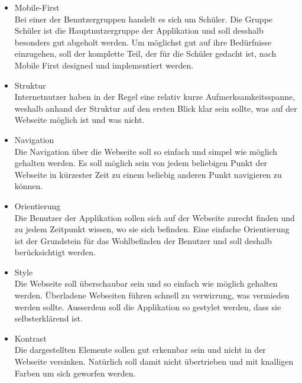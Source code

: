 \begin{itemize}
	\item Mobile-First \\
		Bei einer der Benutzergruppen handelt es sich um Schüler. Die Gruppe Schüler ist die Hauptnutzergruppe der Applikation und soll desshalb besonders gut abgeholt werden. Um möglichst gut auf ihre Bedürfnisse einzugehen, soll der komplette Teil, der für die Schüler gedacht ist, nach Mobile First designed und implementiert werden.
		
	\item Struktur \\
		Internetnutzer haben in der Regel eine relativ kurze Aufmerksamkeitsspanne, weshalb anhand der Struktur auf den ersten Blick klar sein sollte, was auf der Webseite möglich ist und was nicht. 
		
	\item Navigation \\
		Die Navigation über die Webseite soll so einfach und simpel wie möglich gehalten werden. Es soll möglich sein von jedem beliebigen Punkt der Webseite in kürzester Zeit zu einem beliebig anderen Punkt navigieren zu können.
		
	
	\item Orientierung \\
		Die Benutzer der Applikation sollen sich auf der Webseite zurecht finden und zu jedem Zeitpunkt wissen, wo sie sich befinden. Eine einfache Orientierung ist der Grundstein für das Wohlbefinden der Benutzer und soll deshalb berücksichtigt werden.
		
	\item Style \\
		Die Webseite soll überschaubar sein und so einfach wie möglich gehalten werden. Überladene Webseiten führen schnell zu verwirrung, was vermieden werden sollte. Ausserdem soll die Applikation so gestylet werden, dass sie selbsterklärend ist.
		
	\item Kontrast \\
		Die dargestellten Elemente sollen gut erkennbar sein und nicht in der Webseite versinken. Natürlich soll damit nicht übertrieben und mit knalligen Farben um sich geworfen werden.
\end{itemize}

